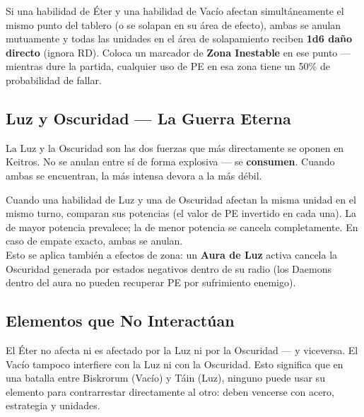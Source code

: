 \begin{tcolorbox}[colback=HammerRed!8, colframe=HammerRed, title=\textbf{REGLA: Colisión Éter–Vacío}]
\small Si una habilidad de Éter y una habilidad de Vacío afectan simultáneamente el mismo punto del tablero (o se solapan en su área de efecto), ambas se anulan mutuamente y todas las unidades en el área de solapamiento reciben \textbf{1d6 daño directo} (ignora RD). Coloca un marcador de \textbf{Zona Inestable} en ese punto — mientras dure la partida, cualquier uso de PE en esa zona tiene un 50\% de probabilidad de fallar.
\end{tcolorbox}

\subsection*{Luz y Oscuridad — La Guerra Eterna}

La Luz y la Oscuridad son las dos fuerzas que más directamente se oponen en Keitros. No se anulan entre sí de forma explosiva — se \textbf{consumen}. Cuando ambas se encuentran, la más intensa devora a la más débil.

\begin{tcolorbox}[colback=HammerRed!8, colframe=HammerRed, title=\textbf{REGLA: Consumo Luz–Oscuridad}]
\small Cuando una habilidad de Luz y una de Oscuridad afectan la misma unidad en el mismo turno, comparan sus potencias (el valor de PE invertido en cada una). La de mayor potencia prevalece; la de menor potencia se cancela completamente. En caso de empate exacto, ambas se anulan.\\[4pt]
Esto se aplica también a efectos de zona: un \textbf{Aura de Luz} activa cancela la Oscuridad generada por estados negativos dentro de su radio (los Daemons dentro del aura no pueden recuperar PE por sufrimiento enemigo).
\end{tcolorbox}

\subsection*{Elementos que No Interactúan}

El Éter no afecta ni es afectado por la Luz ni por la Oscuridad — y viceversa. El Vacío tampoco interfiere con la Luz ni con la Oscuridad. Esto significa que en una batalla entre Biskrorum (Vacío) y Táin (Luz), ninguno puede usar su elemento para contrarrestar directamente al otro: deben vencerse con acero, estrategia y unidades.

